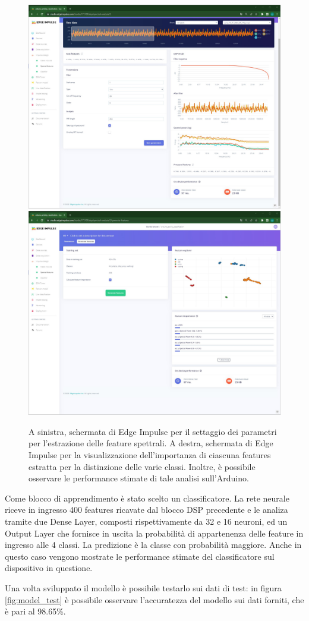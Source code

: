 \begin{figure}[h!]
	\centering
	\includegraphics[width=0.49\linewidth]{./ImageFiles/spectral_features.jpg}
	\includegraphics[width=0.49\linewidth]{./ImageFiles/features_extracted.jpg}
	\caption{A sinistra, schermata di Edge Impulse per il settaggio dei parametri per l'estrazione delle feature spettrali. A destra, schermata di Edge Impulse per la visualizzazione dell'importanza di ciascuna features estratta per la distinzione delle varie classi. Inoltre, è possibile osservare le performance stimate di tale analisi sull'Arduino.}
	\label{fig:spectral_feature}
\end{figure}

Come blocco di apprendimento è stato scelto un classificatore. La rete neurale riceve in ingresso 400 features ricavate dal blocco DSP precedente e le analiza tramite due Dense Layer, composti rispettivamente da 32 e 16 neuroni, ed un Output Layer che fornisce in uscita la probabilità di appartenenza delle feature in ingresso alle 4 classi. La predizione è la classe con probabilità maggiore. Anche in questo caso vengono mostrate le performance stimate del classificatore sul dispositivo in questione. 

Una volta sviluppato il modello è possibile testarlo sui dati di test: in figura \ref{fig:model_test} è possibile osservare l'accuratezza del modello sui dati forniti, che è pari al 98.65\%. 


